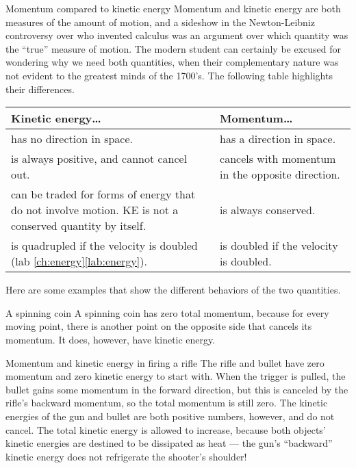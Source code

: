 \begin{envsubsection}{Momentum compared to kinetic energy}
Momentum and kinetic energy are both measures of the
amount of motion, and a sideshow in the Newton-Leibniz
controversy over who invented calculus was an argument over
which quantity was the ``true'' measure of
motion. The modern student can certainly be excused for
wondering why we need both quantities, when their complementary
nature was not evident to the greatest minds of the 1700's.
The following table highlights their differences.

\noindent\begin{tabular}{|p{52mm}|p{52mm}|}
\hline
\textbf{Kinetic energy\ldots}	& \textbf{Momentum\ldots}\\
\hline
has no direction in space. & has a direction in space.\\
\hline
is always positive, and cannot cancel out. & cancels with momentum in the opposite direction.\\
\hline
can be traded for forms of energy that do not involve motion. KE is not
a conserved quantity by itself. & is always conserved.\\
\hline
is quadrupled if the velocity is doubled (lab \ref{ch:energy}\ref{lab:energy}). & is doubled if the velocity is doubled.\\
\hline
\end{tabular}


Here are some examples that show the different behaviors
of the two quantities.

\begin{eg}{A spinning coin}\label{eg:coinmomentum}
A spinning coin has zero total momentum, because for every
moving point, there is another point on the opposite side
that cancels its momentum. It does, however, have kinetic energy.
\end{eg}

\begin{eg}{Momentum and kinetic energy in firing a rifle}
The rifle and bullet have zero momentum and zero kinetic
energy to start with. When the trigger is pulled, the bullet
gains some momentum in the forward direction, but this is
canceled by the rifle's backward momentum, so the total
momentum is still zero. The kinetic energies of the gun and
bullet are both positive numbers, however, and do not
cancel. The total kinetic energy is allowed to increase,
because both objects' kinetic energies are destined to be
dissipated as heat --- the gun's ``backward'' kinetic energy
does not refrigerate the shooter's shoulder!
\end{eg}


\end{envsubsection}
